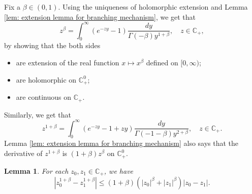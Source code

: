 \documentclass[12pt]{amsart}
\theoremstyle{plain}
\newtheorem{lem}[thm]{Lemma}
\theoremstyle{definition}
\numberwithin{equation}{section}
\begin{document}
    Fix a $\beta \in (0,1)$.
    Using the uniqueness of holomorphic extension and Lemma \ref{lem: extension lemma for branching mechanism}, we get that
\begin{equation}
    z^{\beta}
	= \int_0^\infty (e^{-zy}-1) \frac{dy}{\Gamma(-\beta)y^{1+\beta}},
    \quad z\in \mathbb C_+,
\end{equation}
	by showing that the both sides
\begin{itemize}
\item
    are extension of the real function $x\mapsto x^{\beta}$ defined on $[0,\infty)$;
\item
    are holomorphic on $\mathbb C_+^0$;
\item
    are continuous on $\mathbb C_+$.
\end{itemize}
    Similarly, we get that
\begin{equation}
\label{eq: stable branching on C+}
    z^{1+\beta}
    = \int_0^\infty (e^{-zy}-1+zy)\frac{dy}{\Gamma(-1-\beta)y^{2+\beta}},
    \quad z\in \mathbb C_+.
\end{equation}
    Lemma \ref{lem: extension lemma for branching mechanism} also says that the derivative of $z^{1+\beta}$ is $(1+\beta)z^{\beta}$ on $\mathbb C^0_+$.
\begin{lem}
\label{lem: Lip of power function}
    For each $z_0,z_1 \in \mathbb C_+$, we have
\begin{equation}
\label{eq: Lip of power function}
    |z_0^{1+\beta} - z_1^{1+\beta}|
    \leq (1+\beta)(|z_0|^{\beta}+|z_1|^{\beta})|z_0 - z_1|.
\end{equation}

\end{lem}
\end{document}
